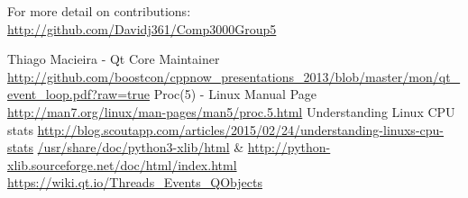 \documentclass[12pt]{article}
\begin{document}
\hfill\break
For more detail on contributions: \url{http://github.com/Davidj361/Comp3000Group5}
	
	
	
	\begin{thebibliography}{3}
	 Thiago Macieira - Qt Core Maintainer \url{http://github.com/boostcon/cppnow_presentations_2013/blob/master/mon/qt_event_loop.pdf?raw=true}
	 Proc(5) - Linux Manual Page
	\url{http://man7.org/linux/man-pages/man5/proc.5.html}
	 Understanding Linux CPU stats \url{http://blog.scoutapp.com/articles/2015/02/24/understanding-linuxs-cpu-stats}
	 \url{/usr/share/doc/python3-xlib/html} \& \url{http://python-xlib.sourceforge.net/doc/html/index.html}
	 \url{https://wiki.qt.io/Threads_Events_QObjects}
	\end{thebibliography}{}
\end{document}

